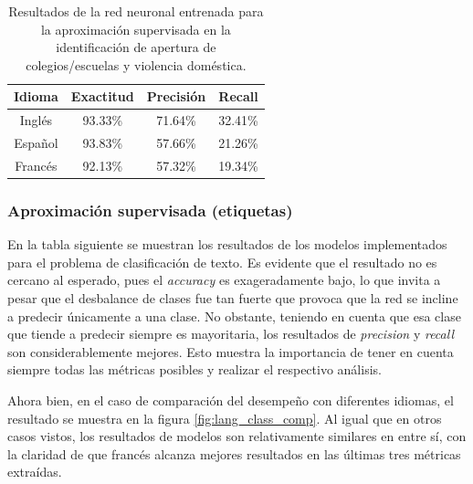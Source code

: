 \begin{table}[H]
    \centering
    \begin{tabular}{|c|c|c|c|}
        \textbf{Idioma} & \textbf{Exactitud} & \textbf{Precisión} & \textbf{Recall} \\ \hline
        Inglés & 93.33\% & 71.64\% & 32.41\% \\
        Español & 93.83\% & 57.66\% & 21.26\% \\
        Francés & 92.13\% & 57.32\% & 19.34\% \\
    \end{tabular}
    \caption{Resultados de la red neuronal entrenada para la aproximación supervisada en la identificación de apertura de colegios/escuelas y violencia doméstica.}
    \label{tab:dc_supervised_metrics_3}
\end{table}

\subsubsection{Aproximación supervisada (etiquetas)}
En la tabla siguiente se muestran los resultados de los modelos implementados para el problema de clasificación de texto. Es evidente que el resultado no es cercano al esperado, pues el \textit{accuracy} es exageradamente bajo, lo que invita a pesar que el desbalance de clases fue tan fuerte que provoca que la red se incline a predecir únicamente a una clase. No obstante, teniendo en cuenta que esa clase que tiende a predecir siempre es mayoritaria, los resultados de \textit{precision} y \textit{recall} son considerablemente mejores. Esto muestra la importancia de tener en cuenta siempre todas las métricas posibles y realizar el respectivo análisis.


Ahora bien, en el caso de comparación del desempeño con diferentes idiomas, el resultado se muestra en la figura \ref{fig:lang_class_comp}. Al igual que en otros casos vistos, los resultados de modelos son relativamente similares en entre sí, con la claridad de que francés alcanza mejores resultados en las últimas tres métricas extraídas.\\

